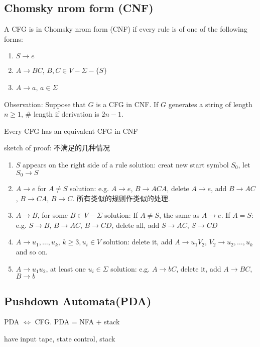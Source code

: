 \subsection{Chomsky nrom form (CNF)}

\begin{definition}
    A CFG is in Chomsky nrom form (CNF) if every rule is of one of the following forms:
    \begin{enumerate}
        \item $S\to e$
        \item $A\to BC$, $B,C\in V-\Sigma-\{S\}$
        \item $A\to a$, $a\in \Sigma$
    \end{enumerate}
\end{definition}

Observation: Suppose that $G$ is a CFG in CNF. If $G$ generates a string of length $n\ge 1$, \# length if derivation is $2n-1$. 

\begin{theorem}
    Every CFG has an equivalent CFG in CNF
\end{theorem}
sketch of proof: 不满足的几种情况
\begin{enumerate}
    \item $S$ appears on the right side of a rule
    \subitem solution: creat new start symbol $S_0$, let $S_0\to S$
    \item $A\to e$ for $A\ne S$
    \subitem solution: e.g. $A\to e$, $B\to ACA$, delete $A\to e$, add $B\to AC$, $B\to CA$, $B\to C$. 所有类似的规则作类似的处理. 
    \item $A\to B$, for some $B\in V-\Sigma$
    \subitem solution: If $A\ne S$, the same as $A\to e$. If $A=S$: e.g. $S\to B$, $B\to AC$, $B\to CD$, delete all, add $S\to AC$, $S\to CD$
    \item $A\to u_1,\dots,u_k$, $k\ge 3, u_i \in V$
    \subitem solution: delete it, add $A\to u_1V_2$, $V_2\to u_2,\dots,u_k$ and so on. 
    \item $A\to u_1 u_2$, at least one $u_i \in \Sigma$
    \subitem solution: e.g. $A\to bC$, delete it, add $A\to BC$, $B\to b$
\end{enumerate}

\subsection{Pushdown Automata(PDA)}
PDA $\iff$ CFG. PDA = NFA + stack

have input tape, state control, stack

